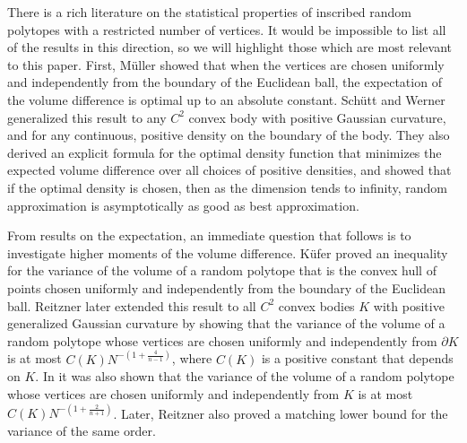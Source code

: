 There is a rich literature on the statistical properties of inscribed random polytopes with a restricted number of vertices. It would be impossible to list all of the results in this direction, so we will highlight those  which are most relevant to this paper. First, M\"uller \cite{muller1990approximation} showed that when the vertices are chosen uniformly and independently from the boundary of the Euclidean ball, the expectation of the volume difference is optimal up to an absolute constant. Sch\"utt and Werner \cite{schutt2003polytopes} generalized this result to any $ C^2 $ convex body with %
positive Gaussian curvature, and for any continuous, positive density on the boundary of the body. They also derived an explicit formula for the optimal density function that minimizes the expected volume difference over all choices of positive densities, and showed that if the optimal density is chosen, then as the dimension tends to infinity, random approximation is asymptotically as good as best approximation.%

From results on the expectation, an immediate question that follows is to investigate higher moments of the volume difference. K\"ufer \cite{kufer1994approximation} proved an inequality for the variance of the volume of a random polytope that is the convex hull of points chosen uniformly and independently from the boundary of the Euclidean ball. Reitzner \cite{reitzner2003random} later extended this result to all $C^2$ convex bodies $K$ with  positive generalized Gaussian curvature by showing that the variance of the volume of a random polytope whose vertices are chosen uniformly and independently from $\partial K$ is at most  $C(K)N^{-(1+\frac{4}{n-1})}$, where $C(K)$ is a positive constant that depends on $K$.  In \cite{reitzner2003random} it was also shown that the variance of the volume of a random polytope whose vertices are chosen uniformly and independently from $ K$  is at most $C(K)N^{-(1+\frac{2}{n+1})}$. Later,  Reitzner \cite{reitzner2005central} also proved a matching  lower bound for the variance of the same order.


